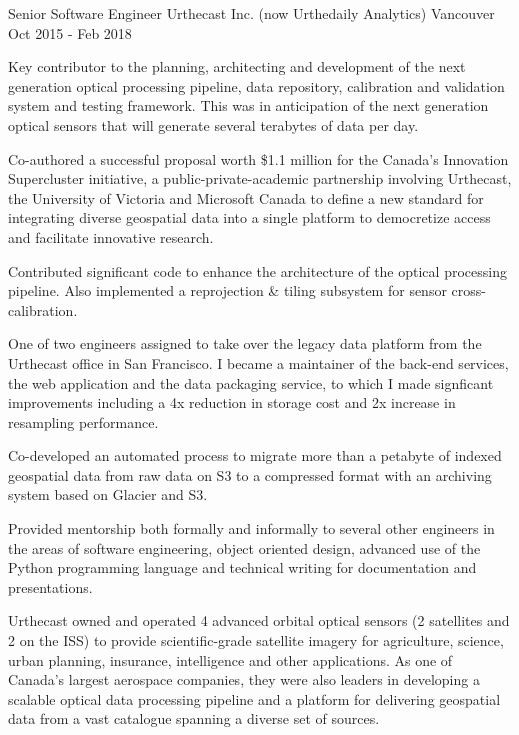 \begin{cventries}
  \cventrywithsummary
    {Senior Software Engineer} %
    {Urthecast Inc. (now Urthedaily Analytics)} %
    {Vancouver} %
    {Oct 2015 - Feb 2018} %
    {
      \begin{cvitems} %
        \item {Key contributor to the planning, architecting and development of the next generation optical processing pipeline, data repository, calibration and validation system and testing framework. This was in anticipation of the next generation optical sensors that will generate several terabytes of data per day.}
        \item {Co-authored a successful proposal worth \$1.1 million for the Canada's Innovation Supercluster initiative, a public-private-academic partnership involving Urthecast, the University of Victoria and Microsoft Canada to define a new standard for integrating diverse geospatial data into a single platform to democretize access and facilitate innovative research.}
        \item {Contributed significant code to enhance the architecture of the optical processing pipeline. Also implemented a reprojection \& tiling subsystem for sensor cross-calibration.}
        \item {One of two engineers assigned to take over the legacy data platform from the Urthecast office in San Francisco. I became a maintainer of the back-end services, the web application and the data packaging service, to which I made signficant improvements including a 4x reduction in storage cost and 2x increase in resampling performance.}
        \item {Co-developed an automated process to migrate more than a petabyte of indexed geospatial data from raw data on S3 to a compressed format with an archiving system based on Glacier and S3.}
        \item {Provided mentorship both formally and informally to several other engineers in the areas of software engineering, object oriented design, advanced use of the Python programming language and technical writing for documentation and presentations.}
      \end{cvitems}
    }
    {
      Urthecast owned and operated 4 advanced orbital optical sensors (2 satellites and 2 on the ISS) to provide scientific-grade satellite imagery for agriculture, science, urban planning, insurance, intelligence and other applications. As one of Canada's largest aerospace companies, they were also leaders in developing a scalable optical data processing pipeline and a platform for delivering geospatial data from a vast catalogue spanning a diverse set of sources.
    }


\end{cventries}

